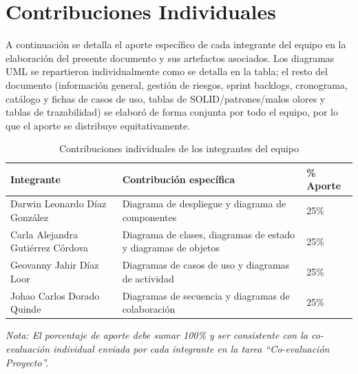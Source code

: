 \chapter*{Contribuciones Individuales}

\noindent A continuación se detalla el aporte específico de cada integrante del equipo en la elaboración del presente documento y sus artefactos asociados. Los diagramas UML se repartieron individualmente como se detalla en la tabla; el resto del documento (información general, gestión de riesgos, sprint backlogs, cronograma, catálogo y fichas de casos de uso, tablas de SOLID/patrones/malos olores y tablas de trazabilidad) se elaboró de forma conjunta por todo el equipo, por lo que el aporte se distribuye equitativamente.

\begin{table}[H]
\centering
\caption{Contribuciones individuales de los integrantes del equipo}
\label{tab:contribuciones}
{\setlength{\tabcolsep}{4pt}
\begin{tabular}{|M{3.4cm}|L{9.7cm}|M{1.6cm}|}
\hline
{}
\textbf{Integrante} & \textbf{Contribución específica} & \textbf{\% Aporte} \\
\hline
Darwin Leonardo Díaz González & Diagrama de despliegue y diagrama de componentes & 25\% \\ \hline
Carla Alejandra Gutiérrez Córdova & Diagrama de clases, diagramas de estado y diagramas de objetos & 25\% \\ \hline
Geovanny Jahir Díaz Loor & Diagramas de casos de uso y diagramas de actividad & 25\% \\ \hline
Johao Carlos Dorado Quinde & Diagramas de secuencia y diagramas de colaboración & 25\% \\ \hline
\end{tabular}
}
\end{table}

\noindent\textit{Nota: El porcentaje de aporte debe sumar 100\% y ser consistente con la co-evaluación individual enviada por cada integrante en la tarea ``Co-evaluación Proyecto''.}
